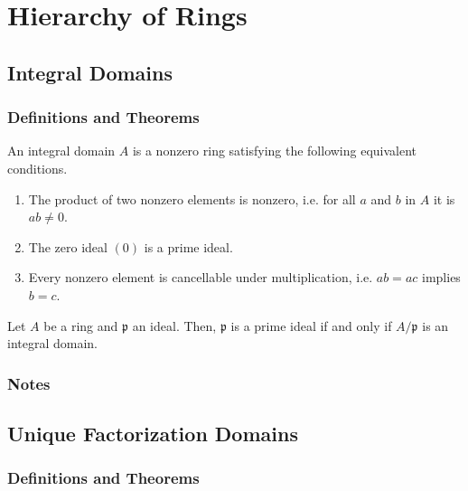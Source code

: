 \chapter{Hierarchy of Rings}

\newpage
\section{Integral Domains}
\subsection*{Definitions and Theorems}
\begin{defbox}
    \begin{definition}
        An integral domain \(A\) is a nonzero ring satisfying the following equivalent conditions.
        \begin{enumerate}
            \item The product of two nonzero elements is nonzero, i.e. for all \(a\) and \(b\) in \(A\) it is \(ab \neq 0\).
            \item The zero ideal \((0)\) is a prime ideal.
            \item Every nonzero element is cancellable under multiplication, i.e. \(ab = ac\) implies \(b = c\).
        \end{enumerate}
    \end{definition}
\end{defbox}

\begin{thmbox}
    \begin{lemma}
        Let \(A\) be a ring and \(\mathfrak{p}\) an ideal. Then, \(\mathfrak{p}\) is a prime ideal if and only if \(A / \mathfrak{p}\) is an integral domain.
    \end{lemma}
\end{thmbox}


\subsection*{Notes}

\newpage
\section{Unique Factorization Domains}
\subsection*{Definitions and Theorems}
